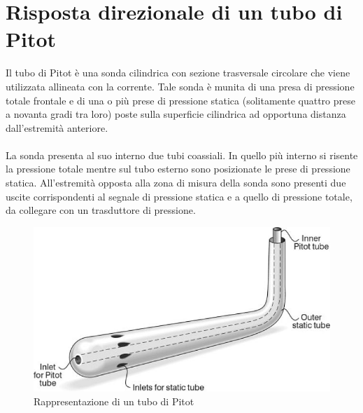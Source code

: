 \section{Risposta direzionale di un tubo di Pitot}
Il tubo di Pitot è una sonda cilindrica con sezione trasversale circolare che viene utilizzata allineata con la corrente. Tale sonda è munita di una presa di pressione totale frontale e di una o più prese di pressione statica (solitamente quattro prese a novanta gradi tra loro) poste sulla superficie cilindrica ad opportuna distanza dall'estremità anteriore.\\\\
La sonda presenta al suo interno due tubi coassiali. In quello più interno si risente la pressione totale mentre sul tubo esterno sono posizionate le prese di pressione statica. All'estremità opposta alla zona di misura della sonda sono presenti due uscite corrispondenti al segnale di pressione statica e a quello di pressione totale, da collegare con un trasduttore di pressione.
\begin{figure}[h]
    \centering
    \includegraphics[width=0.55\linewidth]{images/2/pitotsketch.png}
    \caption{Rappresentazione di un tubo di Pitot}
\end{figure}

